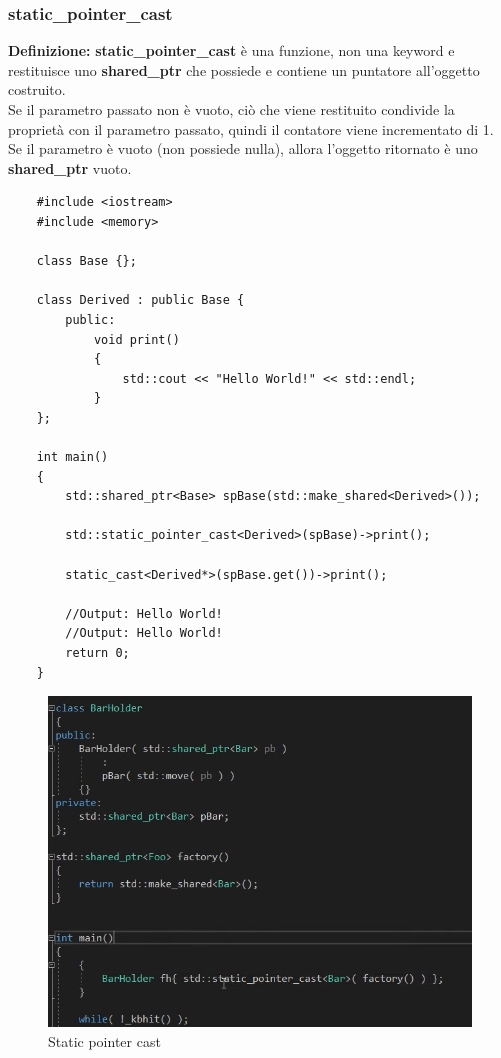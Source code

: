 \subsubsection{static\_pointer\_cast}

\textsf{\small \textbf{Definizione: } \textbf{static\_pointer\_cast} è una funzione, non una keyword e restituisce uno \textbf{shared\_ptr} che possiede e contiene un puntatore all'oggetto costruito.} \\

\textsf{\small Se il parametro passato non è vuoto, ciò che viene restituito condivide la proprietà con il parametro passato, quindi il contatore viene incrementato di 1.} \\

\textsf{\small Se il parametro è vuoto (non possiede nulla), allora l'oggetto ritornato è uno \textbf{shared\_ptr} vuoto.} \\

\begin{lstlisting}
	#include <iostream>
	#include <memory>
	
	class Base {};
	
	class Derived : public Base {
		public:
			void print()
			{
				std::cout << "Hello World!" << std::endl;
			}
	};

	int main()
	{
		std::shared_ptr<Base> spBase(std::make_shared<Derived>());
		
		std::static_pointer_cast<Derived>(spBase)->print();
		
		static_cast<Derived*>(spBase.get())->print();
		
		//Output: Hello World!
		//Output: Hello World!
		return 0;
	}
\end{lstlisting}

\begin{figure}[H]
	\centering
	\includegraphics[width=1\textwidth, height=1\textheight, keepaspectratio]{./imgs/std_shared_ptr_std_static_pointer_cast2.png}
	\caption{Static pointer cast}
	\label{fig:std_shared_ptr_std_static_pointer_cast2}
\end{figure}

